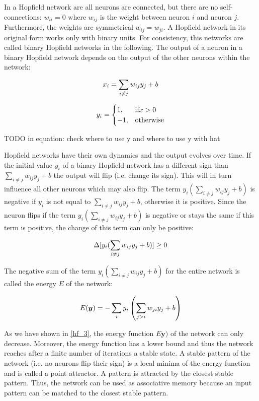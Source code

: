 In a Hopfield network are all neurons are connected, but there are no self-connections: \(w_{ii}=0\) where \(w_{ij}\) is the weight between neuron \(i\) and neuron \(j\).
Furthermore, the weights are symmetrical \(w_{ij} = w_{ji}\).
A Hopfield network in its original form works only with binary units.
For consistency, this networks are called binary Hopfield networks in the following.
The output of a neuron in a binary Hopfield network depends on the output of the other neurons within the network:

\begin{equation}\eqlbl{hf_1}
	x_i = \sum_{i \neq j} w_{ij} y_j + b
\end{equation}

\begin{equation}\eqlbl{hf_2}
	y_i = \begin{cases}
      		1, & \text{if} x > 0 \\
      		-1, & \text{otherwise}
    	\end{cases}
\end{equation}

TODO in equation: check where to use y and where to use y with hat


Hopfield networks have their own dynamics and the output evolves over time.
If the initial value \(y_i\) of a binary Hopfield network has a different sign than \(\sum_{i \neq j} w_{ij}y_j + b\) the output will flip (i.e. change its sign).
This will in turn influence all other neurons which may also flip.
The term \(y_i(\sum_{i \neq j} w_{ij}y_j + b)\) is negative if \(y_i\) is not equal to \(\sum_{i \neq j} w_{ij}y_j + b\), otherwise it is positive.
Since the neuron flips if the term \(y_i(\sum_{i \neq j} w_{ij}y_j + b)\) is negative or stays the same if this term is positive, the change of this term can only be positive:

\begin{equation}\eqlbl{hf_3}
	\Delta [y_i(\sum_{i \neq j} w_{ij} y_j + b)] \geq 0
\end{equation}

The negative sum of the term \(y_i(\sum_{i \neq j} w_{ij}y_j + b)\) for the entire network is called the energy \(E\) of the network:

\begin{equation}\eqlbl{hf_4}
	E(\boldsymbol{y}) = -\sum_{i} y_i \left( \sum_{j>i} w_{ji} y_j + b \right)
\end{equation}

As we have shown in \eqref*{hf_3}, the energy function \(E\boldsymbol{y})\) of the network can only decrease.
Moreover, the energy function has a lower bound and thus the network reaches after a finite number of iterations a stable state. 
A stable pattern of the network (i.e. no neurons flip their sign) is a local minima of the energy function and is called a point attractor.
A pattern is attracted by the closest stable pattern.
Thus, the network can be used as associative memory because an input pattern can be matched to the closest stable pattern.


